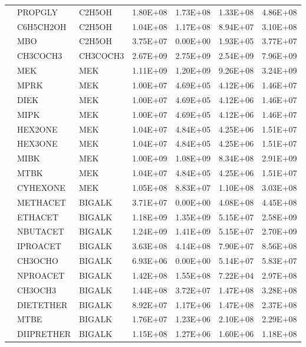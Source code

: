 \begin{longtable}{lllllll}
	 & PROPGLY & C2H5OH & 1.80E+08 & 1.73E+08 & 1.33E+08 & 4.86E+08 \\
	 & C6H5CH2OH & C2H5OH & 1.04E+08 & 1.17E+08 & 8.94E+07 & 3.10E+08 \\
	 & MBO & C2H5OH & 3.75E+07 & 0.00E+00 & 1.93E+05 & 3.77E+07 \\
	\hline \parbox[t]{2mm}{} & CH3COCH3 & CH3COCH3 & 2.67E+09 & 2.75E+09 & 2.54E+09 & 7.96E+09 \\
	 & MEK & MEK & 1.11E+09 & 1.20E+09 & 9.26E+08 & 3.24E+09 \\
	 & MPRK & MEK & 1.00E+07 & 4.69E+05 & 4.12E+06 & 1.46E+07 \\
	 & DIEK & MEK & 1.00E+07 & 4.69E+05 & 4.12E+06 & 1.46E+07 \\
	 & MIPK & MEK & 1.00E+07 & 4.69E+05 & 4.12E+06 & 1.46E+07 \\
	 & HEX2ONE & MEK & 1.04E+07 & 4.84E+05 & 4.25E+06 & 1.51E+07 \\
	 & HEX3ONE & MEK & 1.04E+07 & 4.84E+05 & 4.25E+06 & 1.51E+07 \\
	 & MIBK & MEK & 1.00E+09 & 1.08E+09 & 8.34E+08 & 2.91E+09 \\
	 & MTBK & MEK & 1.04E+07 & 4.84E+05 & 4.25E+06 & 1.51E+07 \\
	 & CYHEXONE & MEK & 1.05E+08 & 8.83E+07 & 1.10E+08 & 3.03E+08 \\
	\hline \parbox[t]{2mm}{} & METHACET & BIGALK & 3.71E+07 & 0.00E+00 & 4.08E+08 & 4.45E+08 \\
	 & ETHACET & BIGALK & 1.18E+09 & 1.35E+09 & 5.15E+07 & 2.58E+09 \\
	 & NBUTACET & BIGALK & 1.24E+09 & 1.41E+09 & 5.15E+07 & 2.70E+09 \\
	 & IPROACET & BIGALK & 3.63E+08 & 4.14E+08 & 7.90E+07 & 8.56E+08 \\
	 & CH3OCHO & BIGALK & 6.93E+06 & 0.00E+00 & 5.14E+07 & 5.83E+07 \\
	 & NPROACET & BIGALK & 1.42E+08 & 1.55E+08 & 7.22E+04 & 2.97E+08 \\
	\hline \parbox[t]{2mm}{} & CH3OCH3 & BIGALK & 1.44E+08 & 3.72E+07 & 1.47E+08 & 3.28E+08 \\*
	 & DIETETHER & BIGALK & 8.92E+07 & 1.17E+06 & 1.47E+08 & 2.37E+08 \\*
	 & MTBE & BIGALK & 1.76E+07 & 1.23E+06 & 2.10E+08 & 2.29E+08 \\
	 & DIIPRETHER & BIGALK & 1.15E+08 & 1.27E+06 & 1.60E+06 & 1.18E+08 \\

\end{longtable}
